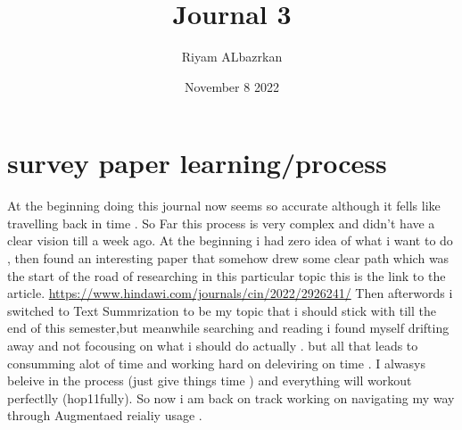 \documentclass{article}
\title{Journal 3}
\author{Riyam ALbazrkan }
\date{November 8 2022}
\begin{document}
\maketitle

\section{survey paper learning/process}
At the beginning doing this journal now seems so accurate although it fells like travelling back in time .
So Far this process is very complex and didn't have a clear vision till a week ago.
At the beginning i had zero idea of what i want to do , then found an interesting paper that somehow drew some clear path which was the start of the road of researching in this particular topic
this is the link to the article.
\newline
\url{https://www.hindawi.com/journals/cin/2022/2926241/}
Then afterwords i switched to Text Summrization to be my topic that i should stick with till the end of this semester,but meanwhile searching and reading i found myself drifting away and not focousing on what i should do actually .
but all that leads to consumming alot of time and working hard on deleviring on time .
I alwasys beleive in the process (just give things time ) and everything will workout perfectlly (hop11fully).
So now i am back on track working on navigating my way through Augmentaed reialiy usage .
\newpage
\end{document}
